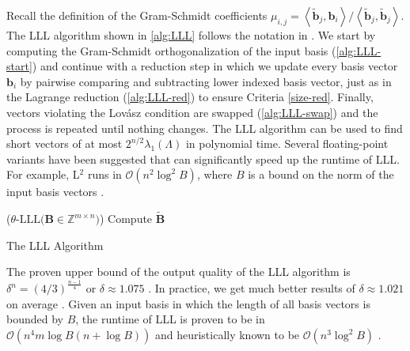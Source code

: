 Recall the definition of the Gram-Schmidt coefficients $\mu_{i, j} = \left\langle \tilde{\mathbf{b}}_j, \mathbf{b}_i\right\rangle / \left\langle \tilde{\mathbf{b}}_j, \tilde{\mathbf{b}}_j\right\rangle$. The LLL algorithm shown in \cref{alg:LLL} follows the notation in \cite{LLLReg04}. We start by computing the Gram-Schmidt orthogonalization of the input basis (\cref{alg:LLL-start}) and continue with a reduction step in which we update every basis vector $\mathbf{b}_i$ by pairwise comparing and subtracting lower indexed basis vector, just as in the Lagrange reduction (\cref{alg:LLL-red}) to ensure Criteria \ref{size-red}. Finally, vectors violating the Lovász condition are swapped (\cref{alg:LLL-swap}) and the process is repeated until nothing changes. The LLL algorithm can be used to find short vectors of at most $2^{n/2} \lambda_1(\Lambda)$ in polynomial time. Several floating-point variants have been suggested that can significantly speed up the runtime of LLL. For example, L$^2$ runs in $\mathcal{O}(n^2 \log^2 B)$, where $B$ is a bound on the norm of the input basis vectors \cite{NS05}. %

\begin{algorithm2e}
  \Begin($\theta\text{-LLL} {(}\mathbf{B} \in \mathbb{Z}^{m\times n} {)}$) %
  {
    Compute $\tilde{\mathbf{B}}$\label{alg:LLL-start}\\
  }
  \caption[The LLL Algorithm]{The LLL Algorithm \cite{LLL82}} \label{alg:LLL}
\end{algorithm2e}


The proven upper bound of the output quality of the LLL algorithm is $\delta^n = \left(4/3\right)^{\frac{n-1}{4}}$ or $\delta \approx 1.075$ \cite{LLL82}. In practice, we get much better results of $\delta \approx 1.021$ on average \cite{Chen13}. Given an input basis in which the length of all basis vectors is bounded by $B$, the runtime of LLL is proven to be in $\mathcal{O}\left(n^4m\log B(n+\log B)\right)$ \cite{NS05} and heuristically known to be $\mathcal{O}\left(n^{3}\log^2 B\right)$ \cite{APS15}.



